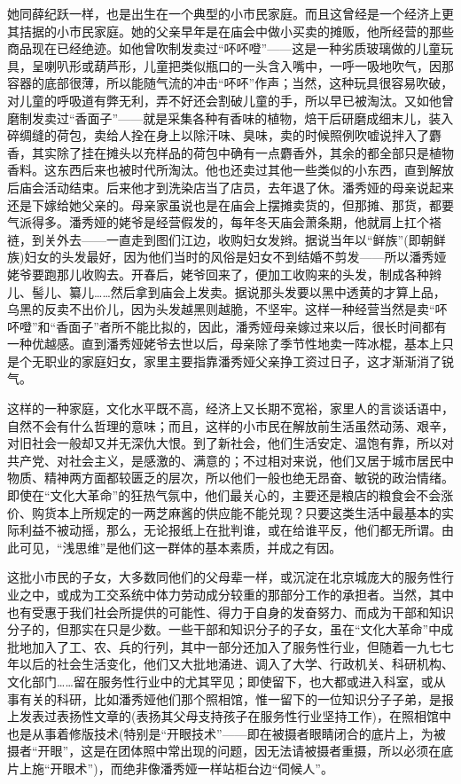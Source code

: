 \par 她同薛纪跃一样，也是出生在一个典型的小市民家庭。而且这曾经是一个经济上更其拮据的小市民家庭。她的父亲早年是在庙会中做小买卖的摊贩，他所经营的那些商品现在已经绝迹。如他曾吹制发卖过“吥吥噔”——这是一种劣质玻璃做的儿童玩具，呈喇叭形或葫芦形，儿童把类似瓶口的一头含入嘴中，一呼一吸地吹气，因那容器的底部很薄，所以能随气流的冲击“吥吥”作声；当然，这种玩具很容易吹破，对儿童的呼吸道有弊无利，弄不好还会割破儿童的手，所以早已被淘汰。又如他曾磨制发卖过“香面子”——就是采集各种有香味的植物，焙干后研磨成细末儿，装入碎绸缝的荷包，卖给人拴在身上以除汗味、臭味，卖的时候照例吹嘘说拌入了麝香，其实除了挂在摊头以充样品的荷包中确有一点麝香外，其余的都全部只是植物香料。这东西后来也被时代所淘汰。他也还卖过其他一些类似的小东西，直到解放后庙会活动结束。后来他才到洗染店当了店员，去年退了休。潘秀娅的母亲说起来还是下嫁给她父亲的。母亲家虽说也是在庙会上摆摊卖货的，但那摊、那货，都要气派得多。潘秀娅的姥爷是经营假发的，每年冬天庙会萧条期，他就肩上扛个褡裢，到关外去——一直走到图们江边，收购妇女发辫。据说当年以“鲜族”(即朝鲜族)妇女的头发最好，因为他们当时的风俗是妇女不到结婚不剪发——所以潘秀娅姥爷要跑那儿收购去。开春后，姥爷回来了，便加工收购来的头发，制成各种辫儿、髻儿、纂儿……然后拿到庙会上发卖。据说那头发要以黑中透黄的才算上品，乌黑的反卖不出价儿，因为头发越黑则越脆，不坚牢。这样一种经营当然是卖“吥吥噔”和“香面子”者所不能比拟的，因此，潘秀娅母亲嫁过来以后，很长时间都有一种优越感。直到潘秀娅姥爷去世以后，母亲除了季节性地卖一阵冰棍，基本上只是个无职业的家庭妇女，家里主要指靠潘秀娅父亲挣工资过日子，这才渐渐消了锐气。
\par 这样的一种家庭，文化水平既不高，经济上又长期不宽裕，家里人的言谈话语中，自然不会有什么哲理的意味；而且，这样的小市民在解放前生活虽然动荡、艰辛，对旧社会一般却又并无深仇大恨。到了新社会，他们生活安定、温饱有靠，所以对共产党、对社会主义，是感激的、满意的；不过相对来说，他们又居于城市居民中物质、精神两方面都较匮乏的层次，所以他们一般也绝无昂奋、敏锐的政治情绪。即使在“文化大革命”的狂热气氛中，他们最关心的，主要还是粮店的粮食会不会涨价、购货本上所规定的一两芝麻酱的供应能不能兑现？只要这类生活中最基本的实际利益不被动摇，那么，无论报纸上在批判谁，或在给谁平反，他们都无所谓。由此可见，“浅思维”是他们这一群体的基本素质，并成之有因。
\par 这批小市民的子女，大多数同他们的父母辈一样，或沉淀在北京城庞大的服务性行业之中，或成为工交系统中体力劳动成分较重的那部分工作的承担者。当然，其中也有受惠于我们社会所提供的可能性、得力于自身的发奋努力、而成为干部和知识分子的，但那实在只是少数。一些干部和知识分子的子女，虽在“文化大革命”中成批地加入了工、农、兵的行列，其中一部分还加入了服务性行业，但随着一九七七年以后的社会生活变化，他们又大批地涌进、调入了大学、行政机关、科研机构、文化部门……留在服务性行业中的尤其罕见；即使留下，也大都或进入科室，或从事有关的科研，比如潘秀娅他们那个照相馆，惟一留下的一位知识分子子弟，是报上发表过表扬性文章的(表扬其父母支持孩子在服务性行业坚持工作)，在照相馆中也是从事着修版技术(特别是“开眼技术”——即在被摄者眼睛闭合的底片上，为被摄者“开眼”，这是在团体照中常出现的问题，因无法请被摄者重摄，所以必须在底片上施“开眼术”)，而绝非像潘秀娅一样站柜台边“伺候人”。
